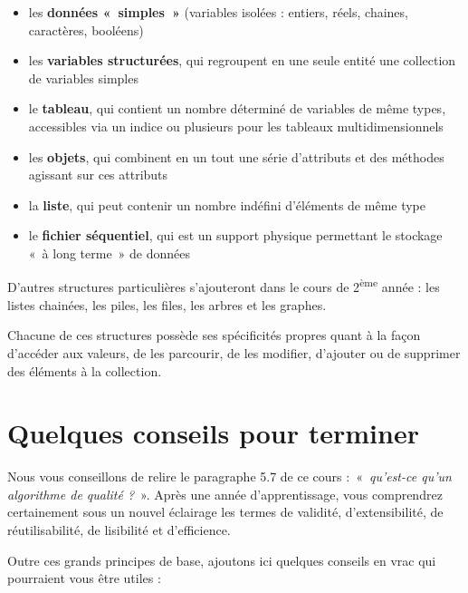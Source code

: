 \liststyleListi
\begin{itemize}
\item {
les \textbf{données «~simples~»} (variables isolées : entiers, réels,
chaines, caractères, booléens)}
\item {
les \textbf{variables structurées}, qui regroupent en une seule entité
une collection de variables simples}
\item {
le \textbf{tableau}, qui contient un nombre déterminé de variables de
même types, accessibles via un indice ou plusieurs pour les tableaux
multidimensionnels}
\item {
les \textbf{objets}, qui combinent en un tout une série d’attributs et
des méthodes agissant sur ces attributs}
\item {
la \textbf{liste}, qui peut contenir un nombre indéfini d’éléments de
même type}
\item {
le \textbf{fichier séquentiel}, qui est un support physique permettant
le stockage «~à long terme~» de données}
\end{itemize}
{
D’autres structures particulières s’ajouteront dans le cours de
2\textsuperscript{ème} année : les listes chainées, les piles, les
files, les arbres et les graphes.}

{
Chacune de ces structures possède ses spécificités propres quant à la
façon d’accéder aux valeurs, de les parcourir, de les modifier,
d’ajouter ou de supprimer des éléments à la collection. }

\section[Quelques conseils pour terminer]{\bfseries Quelques conseils
pour terminer}
{
Nous vous conseillons de relire le paragraphe 5.7 de ce cours
:~«~\textit{qu’est-ce qu’un algorithme de qualité ?}~». Après une année
d’apprentissage, vous comprendrez certainement sous un nouvel éclairage
les termes de validité, d’extensibilité, de réutilisabilité, de
lisibilité et d’efficience.}

{
Outre ces grands principes de base, ajoutons ici quelques conseils en
vrac qui pourraient vous être utiles :}

